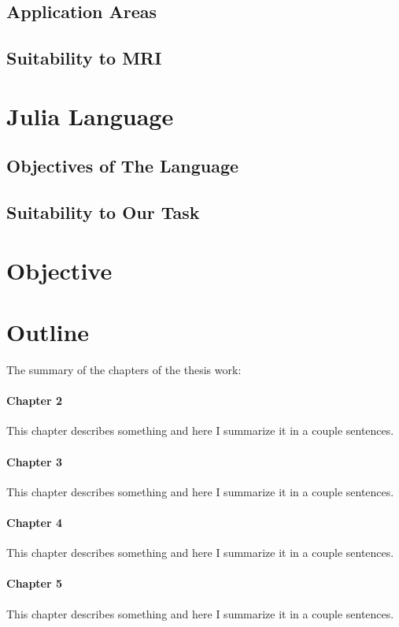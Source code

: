 \subsection{Application Areas}
\subsection{Suitability to MRI}

\section{Julia Language}
\subsection{Objectives of The Language}
\subsection{Suitability to Our Task}

\section{Objective}

\section{Outline}
The summary of the chapters of the thesis work:

\paragraph{Chapter 2} This chapter describes something and here I summarize it in a couple sentences.

\paragraph{Chapter 3} This chapter describes something and here I summarize it in a couple sentences.

\paragraph{Chapter 4} This chapter describes something and here I summarize it in a couple sentences.

\paragraph{Chapter 5} This chapter describes something and here I summarize it in a couple sentences.

\clearpage %